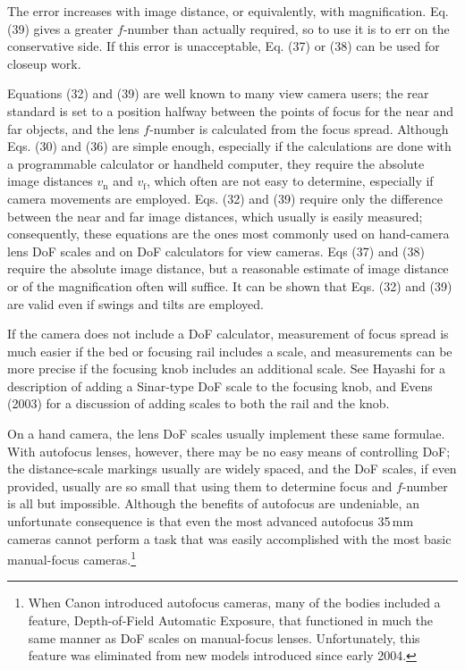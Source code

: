 \documentclass[11pt, oneside]{scrartcl}   	%
\begin{document}
The error increases with image distance, or equivalently, with magnification. Eq. (39) gives a greater $f$-number than actually required, so to use it is to err on the conservative side. If this error is unacceptable, Eq. (37) or (38) can be used for closeup work.

Equations (32) and (39) are well known to many view camera users; the rear standard is set to a position halfway between the points of focus for the near and far objects, and the lens $f$-number is calculated from the focus spread. Although Eqs. (30) and (36) are simple enough, especially if the calculations are done with a programmable calculator or handheld computer, they require the absolute image distances $v_\mathrm{n}$ and $v_\mathrm{f}$, which often are not easy to determine, especially if camera movements are employed. Eqs. (32) and (39) require only the difference between the near and far image distances, which usually is easily measured; consequently, these equations are the ones most commonly used on hand-camera lens DoF scales and on DoF calculators for view cameras. Eqs (37) and (38) require the absolute image distance, but a reasonable estimate of image distance or of the magnification often will suffice. It can be shown that Eqs. (32) and (39) are valid even if swings and tilts are employed.

If the camera does not include a DoF calculator, measurement of focus spread is much easier if the bed or focusing rail includes a scale, and measurements can be more precise if the focusing knob includes an additional scale. See Hayashi for a description of adding a Sinar-type DoF scale to the focusing knob, and Evens (2003) for a discussion of adding scales to both the rail and the knob.

On a hand camera, the lens DoF scales usually implement these same formulae. With autofocus lenses, however, there may be no easy means of controlling DoF; the distance-scale markings usually are widely spaced, and the DoF scales, if even provided, usually are so small that using them to determine focus and $f$-number is all but impossible. Although the benefits of autofocus are undeniable, an unfortunate consequence is that even the most advanced autofocus 35\,mm cameras cannot perform a task that was easily accomplished with the most basic manual-focus cameras.\footnote{When Canon introduced autofocus cameras, many of the bodies included a feature, Depth-of-Field Automatic Exposure, that functioned in much the same manner as DoF scales on manual-focus lenses. Unfortunately, this feature was eliminated from new models introduced since early 2004.}
\end{document}
